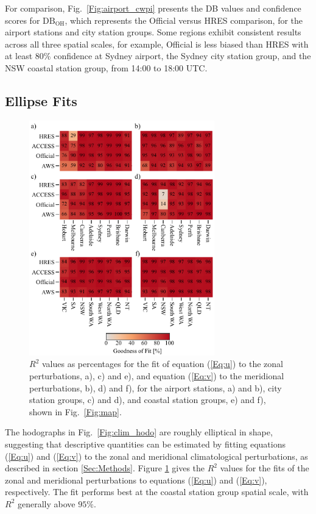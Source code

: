 \documentclass[twocol]{ametsoc}
\begin{document}
For comparison, Fig.~\ref{Fig:airport_cwpi} presents the DB values and confidence scores for $\text{DB}_\text{OH}$, which represents the Official versus HRES comparison, for the airport stations and city station groups. Some regions exhibit consistent results across all three spatial scales, for example, Official is less biased than HRES with at least $80 \%$ confidence at Sydney airport, the Sydney city station group, and the NSW coastal station group, from 14:00 to 18:00 UTC.  

\subsection{Ellipse Fits}

\begin{figure}
\centering
\includegraphics[width=19pc]{r_squared.pdf}
\caption{$R^2$ values as percentages for the fit of equation (\ref{Eq:u}) to the zonal perturbations, a), c) and e), and equation (\ref{Eq:v}) to the meridional perturbations, b), d) and f), for the airport stations, a) and b), city station groups, c) and d), and coastal station groups, e) and f), shown in Fig.~\ref{Fig:map}.}
\label{Fig:r_squared}
\end{figure}

The hodographs in Fig.~\ref{Fig:clim_hodo} are roughly elliptical in shape, suggesting that descriptive quantities can be estimated by fitting equations (\ref{Eq:u}) and (\ref{Eq:v}) to the zonal and meridional climatological perturbations, as described in section \ref{Sec:Methods}. Figure \ref{Fig:r_squared} gives the $R^2$ values for the fits of the zonal and meridional perturbations to equations (\ref{Eq:u}) and (\ref{Eq:v}), respectively. The fit performs best at the coastal station group spatial scale, with $R^2$ generally above $95\%$. 
\end{document}

